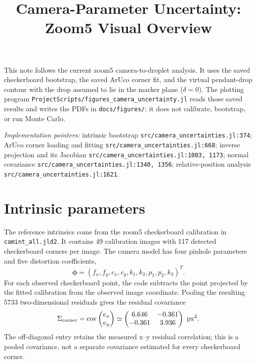 \documentclass[11pt]{article}
\title{Camera-Parameter Uncertainty: Zoom5 Visual Overview}
\author{}
\date{}
\begin{document}
\maketitle

\noindent
This note follows the current zoom5 camera-to-droplet analysis. It uses the
saved checkerboard bootstrap, the saved ArUco corner fit, and the virtual
pendant-drop contour with the drop assumed to lie in the marker plane
(\(\delta=0\)). The plotting program
\texttt{ProjectScripts/figures\_camera\_uncertainty.jl} reads those saved
results and writes the PDFs in \texttt{docs/figures/}; it does not calibrate,
bootstrap, or run Monte Carlo.

\noindent\textit{Implementation pointers:} intrinsic bootstrap
\texttt{src/camera\_uncertainties.jl:374}; ArUco corner loading and fitting
\texttt{src/camera\_uncertainties.jl:668}; inverse projection and its Jacobian
\texttt{src/camera\_uncertainties.jl:1003, 1173}; normal covariance
\texttt{src/camera\_uncertainties.jl:1340, 1356}; relative-position analysis
\texttt{src/camera\_uncertainties.jl:1621}.

\section{Intrinsic parameters}

The reference intrinsics come from the zoom5 checkerboard calibration in
\texttt{camint\_all.jld2}. It contains 49 calibration images with 117
detected checkerboard corners per image. The camera model has four pinhole
parameters and five distortion coefficients,
\[
  \boldsymbol{\phi}
  = (f_x,f_y,c_x,c_y,k_1,k_2,p_1,p_2,k_3)^T.
\]
For each observed checkerboard point, the code subtracts the point projected
by the fitted calibration from the observed image coordinate. Pooling the
resulting 5733 two-dimensional residuals gives the residual covariance
\[
  \Sigma_{\mathrm{corner}}
  = \operatorname{cov}
    \begin{pmatrix}e_x\\e_y\end{pmatrix}
  \simeq
  \begin{pmatrix}
    6.646 & -0.361\\
    -0.361 & 3.936
  \end{pmatrix}\ {\rm px}^2.
\]
The off-diagonal entry retains the measured x--y residual correlation; this
is a pooled covariance, not a separate covariance estimated for every
checkerboard corner.
\end{document}
